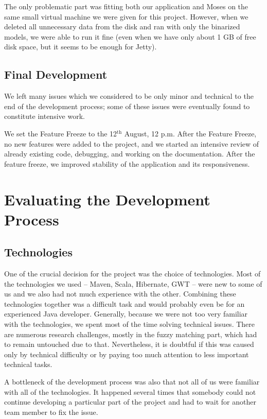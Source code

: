 The only problematic part was fitting both our application and Moses on the same small virtual machine we were given for this project. However, when we deleted all unnecessary data from the disk and ran with only the binarized models, we were able to run it fine (even when we have only about 1 GB of free disk space, but it seems to be enough for Jetty).

\subsection{Final Development}
\label{subsec:final_development}

We left many issues which we considered to be only minor and technical
to the end of the development process;
some of these issues were eventually found to constitute intensive work.

We set the Feature Freeze to the 12$^\mathrm{th}$ August, 12 p.m.
After the Feature Freeze, no new features were added to the project, and 
we started an intensive review of already existing code, debugging, and 
working on the documentation. After the feature freeze, we improved 
stability of the application and its responsiveness. 


\section{Evaluating the Development Process}

\subsection{Technologies}
One of the crucial decision for the project was the choice of technologies. Most of the technologies we used -- Maven, Scala, Hibernate, GWT -- were new to some of us and we also had not much experience with the other. Combining these technologies together was a difficult task and would probably even be for an experienced Java developer. Generally, because we were not too very familiar with the technologies, we spent most of the time solving technical issues. There are numerous research challenges, mostly in the fuzzy matching part, which had to remain untouched due to that. Nevertheless, it is doubtful if this was caused only by technical difficulty or by paying too much attention to less important technical tasks.


A bottleneck of the development process was also that not all of us were familiar with all of the technologies. It happened several times that somebody could not continue developing a particular part of the project and had to wait for another team member to fix the issue.

